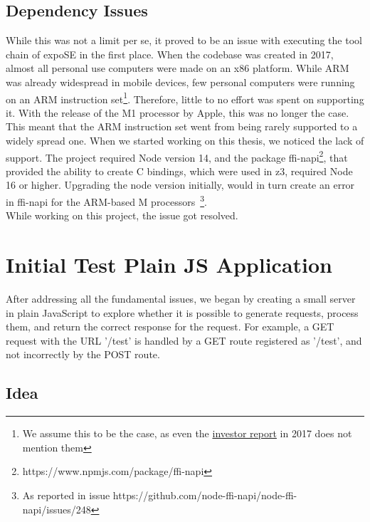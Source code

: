\subsection{Dependency Issues}
\label{sec:dep-issues}
While this was not a limit per se, it proved to be an issue with executing the tool chain of expoSE in the first place. When the codebase was created in 2017, almost all personal use computers were made on an x86 platform. While ARM was already widespread in mobile devices, few personal computers were running on an ARM instruction set\footnote{We assume this to be the case, as even the \href{https://www.arm.com/-/media/global/company/investors/Arm\%20Strategic\%20Review\%20-\%202017.pdf?revision=8473a535-6f7e-4ce5-85fe-0eb6f1f75487&la=en}{investor report} in 2017 does not mention them}. Therefore, little to no effort was spent on supporting it. 
With the release of the M1 processor by Apple, this was no longer the case.
This meant that the ARM instruction set went from being rarely supported to a widely spread one.
When we started working on this thesis, we noticed the lack of support. The project required Node version 14, and the package ffi-napi\footnote{https://www.npmjs.com/package/ffi-napi}, that provided the ability to create C bindings, which were used in z3, required Node 16 or higher.
Upgrading the node version initially, would in turn create an error in ffi-napi for the ARM-based M processors~\footnote{As reported in issue https://github.com/node-ffi-napi/node-ffi-napi/issues/248}.\\
While working on this project, the issue got resolved.



\section{Initial Test Plain JS Application}
\label{sec:init-test-plain}
After addressing all the fundamental issues, we began by creating a small server in plain JavaScript to explore whether it is possible to generate requests, process them, and return the correct response for the request. For example, a GET request with the URL '/test' is handled by a GET route registered as '/test', and not incorrectly by the POST route. 

\subsection{Idea}

